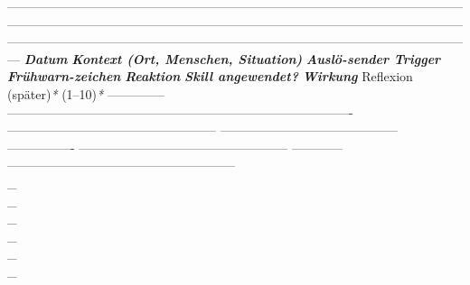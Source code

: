 {{---------------------------------------------------------------------------------------------------------------------------------------------------------------------------------------------------------------------------------------------------------------------------------------------------------------------------------------
\textbf{\textit{Datum}}    \textbf{\textit{Kontext (Ort, Menschen, Situation)}}                                           \textbf{\textit{Auslö-sender \textcolor{ctmmRed}{Trigger}}}                         \textbf{\textit{Frühwarn-zeichen}}                     \textbf{\textit{Reaktion}}   \textbf{\textit{Skill angewendet?}}                            \textbf{\textit{Wirkung   }}Reflexion (später)\textit{*}
(1--10)\textit{*}
-------------- ---------------------------------------------------------------------------------- -------------------------------------------------- ------------------------------------------ ---------------- -------------------------------------------------- ------------ ------------------------------------------------------
\textcolor{ctmmBlue}{\faEdit}             \textcolor{ctmmBlue}{\faEdit}                                                                                 \textcolor{ctmmBlue}{\faEdit}                                                 \textcolor{ctmmBlue}{\faEdit}                                         \textcolor{ctmmBlue}{\faEdit} \\\_\\\_\\\_\\\_\\\_\\\_  \textcolor{ctmmBlue}{\faEdit}                                                 \textcolor{ctmmBlue}{\faEdit}           \textcolor{ctmmBlue}{\faEdit}
}}
